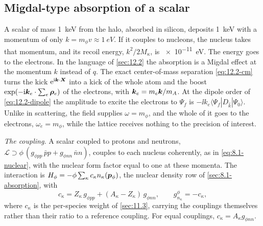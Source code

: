 \subsection{Migdal-type absorption of a scalar}\label{sec:12.6-absorption}

A scalar of mass \SI{1}{keV} from the halo, absorbed in silicon, deposits \SI{1}{keV} with a momentum of only $k = m_\phi v \approx \SI{1}{eV}$. If it couples to nucleons, the nucleus takes that momentum, and its recoil energy, $k^2/2M_\kappa$, is \SI{e-11}{eV}. The energy goes to the electrons. In the language of \cref{sec:12.2} the absorption is a Migdal effect at the momentum $k$ instead of $q$. The exact center-of-mass separation \cref{eq:12.2-cm} turns the kick $\mathrm{e}^{\mathrm{i}\bm{k}\cdot\bm{X}}$ into a kick of the whole atom and the boost $\exp(-\mathrm{i}\bm{k}_e\cdot\sum_e\bm{\rho}_e)$ of the electrons, with $\bm{k}_e = m_e\bm{k}/m_A$. At the dipole order of \cref{eq:12.2-dipole} the amplitude to excite the electrons to $\Psi_f$ is $-\ii k_e\langle\Psi_f|D_{\hat k}|\Psi_0\rangle$. Unlike in scattering, the field supplies $\omega = m_\phi$, and the whole of it goes to the electrons, $\omega_e = m_\phi$, while the lattice receives nothing to the precision of interest.

\emph{The coupling.} A scalar coupled to protons and neutrons, $\mathcal{L} \supset \phi\,(g_{\phi pp}\,\bar pp + g_{\phi nn}\,\bar nn)$, couples to each nucleus coherently, as in \cref{eq:8.1-nuclear}, with the nuclear form factor equal to one at these momenta. The interaction is $H_\phi = -\phi\sum_\kappa c_\kappa n_\kappa(\bm{p}_\phi)$, the nuclear density row of \cref{sec:8.1-absorption}, with
\begin{equation*}
  c_\kappa = Z_\kappa\,g_{\phi pp} + (A_\kappa - Z_\kappa)\,g_{\phi nn} , \qquad g^\phi_{n_\kappa} = -c_\kappa ,
\end{equation*}
where $c_\kappa$ is the per-species weight of \cref{sec:11.3}, carrying the couplings themselves rather than their ratio to a reference coupling. For equal couplings, $c_\kappa = A_\kappa g_{\phi nn}$.

